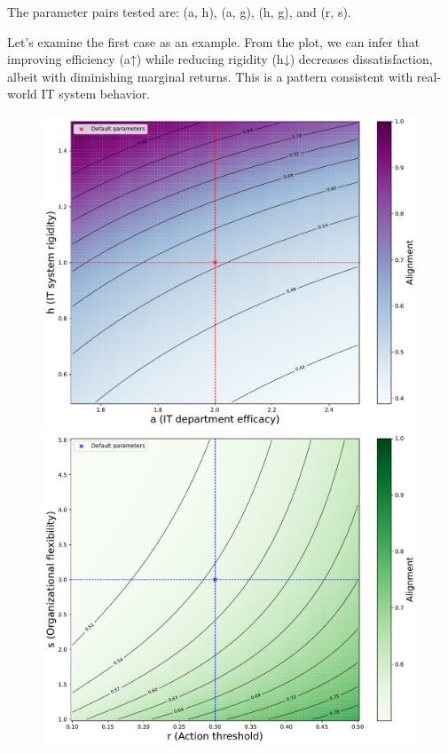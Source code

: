 \documentclass[a4paper, 10pt]{article}
\begin{document}
The parameter pairs tested are: (a, h), (a, g), (h, g), and (r, s).

Let’s examine the first case as an example. From the plot, we can infer that improving efficiency (a↑) while reducing rigidity (h↓) decreases dissatisfaction, albeit with diminishing marginal returns.  
This is a pattern consistent with real-world IT system behavior.

\begin{figure}[h]
    \centering
    \begin{minipage}[b]{0.48\textwidth}
        \includegraphics[width=\textwidth]{../images/int-cases/sim-1.pdf}
    \end{minipage}
    \hfill
    \begin{minipage}[b]{0.48\textwidth}
        \includegraphics[width=\textwidth]{../images/int-cases/sim-2.pdf}

\end{minipage}
\end{figure}
\end{document}
